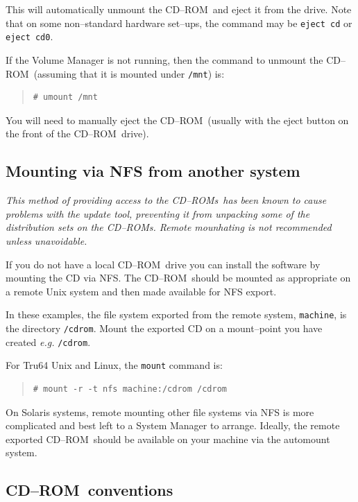 \documentclass[twoside,11pt]{article}
\newcommand{\xlabel}[1]{}
\renewcommand{\_}{\texttt{\symbol{95}}}
\newcommand{\cdrom}{CD--ROM}
\newcommand{\cdrom}{CD-ROM}
\newcommand{\cdroms}{CD--ROMs}
\newcommand{\cdroms}{CD-ROMs}
\begin{document}
This will automatically unmount the \cdrom\ and eject it from the drive.
Note that on some non--standard hardware set--ups, the command may be
\texttt{eject cd} or \texttt{eject cd0}.

If the Volume Manager is not running, then the command to unmount the
\cdrom\ (assuming that it is mounted under \texttt{/mnt}) is:

\begin{quote}
\begin{verbatim}
# umount /mnt
\end{verbatim}
\end{quote}

You will need to manually eject the \cdrom\ (usually with the eject
button on the front of the \cdrom\ drive).

\subsection{\xlabel{mount__via_nfs}Mounting via NFS from another system}
\label{mount_via_nfs}

\textit{This method of providing access to the \cdroms\ has been known
to cause problems with the update tool, preventing it from unpacking some
of the distribution sets on the \cdroms.  Remote mounhating is
not recommended unless unavoidable.}

If you do not have a local \cdrom\ drive you can install the
software by mounting the CD via NFS\@.  The \cdrom\ should be mounted as
appropriate on a remote Unix system and then made available for NFS
export.

In these examples, the file system exported from the remote system,
\texttt{machine}, is the directory \texttt{/cdrom}.  Mount the exported
CD on a mount--point you have created \textsl{e.g.} \texttt{/cdrom}.

For Tru64 Unix and Linux, the \texttt{mount}  command is:

\begin{quote}
\begin{verbatim}
# mount -r -t nfs machine:/cdrom /cdrom
\end{verbatim}
\end{quote}

On Solaris systems, remote mounting other file systems via NFS is more
complicated and best left to a System Manager to arrange.  Ideally,
the remote exported \cdrom\ should be available on your machine via the
automount system.

\subsection{\xlabel{cdrom_conventions}\cdrom\ conventions}
\label{cdrom_conventions}
\end{document}
